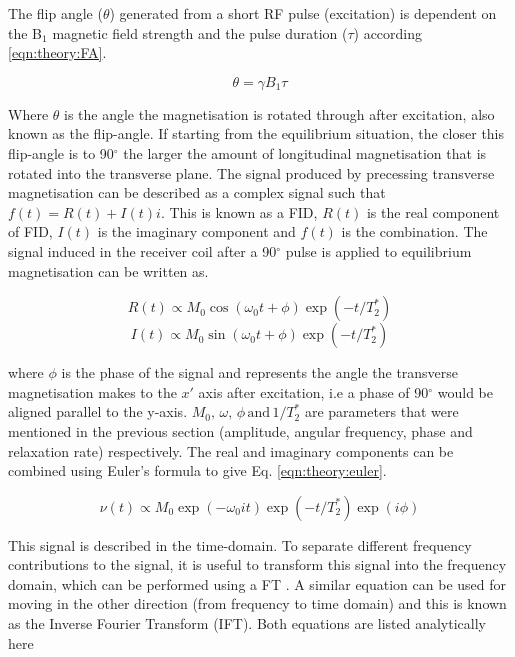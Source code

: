 The flip angle ($\theta$) generated from a short \ac{RF} pulse (excitation) is dependent on the B$_1$ magnetic field strength and the pulse duration ($\tau$) according \ref{eqn:theory:FA}.

\begin{equation}
    \theta = \gamma B_1 \tau
    \label{eqn:theory:FA}
\end{equation}

Where $\theta$ is the angle the magnetisation is rotated through after excitation, also known as the flip-angle. If starting from the equilibrium situation, the closer this flip-angle is to 90$^\circ$ the larger the amount of longitudinal magnetisation that is rotated into the transverse plane. The signal produced by precessing transverse magnetisation can be described as a complex signal such that $f(t) = R(t) + I(t)i$. This is known as a \ac{FID}, $R(t)$ is the real component of \ac{FID}, $I(t)$ is the imaginary component and $f(t)$ is the combination. The signal induced in the receiver coil after a 90$^\circ$ pulse is applied to equilibrium magnetisation can be written as.

\begin{equation}
    R(t) \propto M_0\cos(\omega_0 t+ \phi)\exp(-t/T_2^*)
    \label{eqn:theory:real}
\end{equation}
\begin{equation}
    I(t) \propto M_0\sin(\omega_0 t+ \phi)\exp(-t/T_2^*)
    \label{eqn:theory:imag}
\end{equation}

\noindent where $\phi$ is the phase of the signal and represents the angle the transverse magnetisation makes to the $x'$ axis after excitation, i.e a phase of 90$^\circ$ would be aligned parallel to the y-axis. $M_0, \, \omega, \, \phi \, \textrm{and} \, 1/T_2^*$ are parameters that were mentioned in the previous section (amplitude, angular frequency, phase and relaxation rate) respectively. The real and imaginary components can be combined using Euler's formula to give Eq. \ref{eqn:theory:euler}. 

\begin{equation}
    \nu(t) \propto M_0\exp(-\omega_0 i t)\exp(-t/T_2^*)\exp(i\phi)
    \label{eqn:theory:euler}
\end{equation}

This signal is described in the time-domain. To separate different frequency contributions to the signal, it is useful to transform this signal into the frequency domain, which can be performed using a \ac{FT} \cite{Fourier1822TheorieChaleur}. A similar equation can be used for moving in the other direction (from frequency to time domain) and this is known as the Inverse Fourier Transform (IFT). Both equations are listed analytically here

